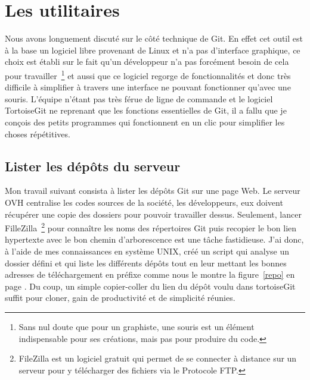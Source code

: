\section{Les utilitaires} %
\label{sec:Les utilitaires}

Nous avons longuement discuté sur le côté technique de Git. En effet cet
outil est à la base un logiciel libre provenant de Linux et n'a pas
d'interface graphique, ce choix est établi sur le fait qu'un développeur
n'a pas forcément besoin de cela pour travailler\, \footnote{Sans nul
doute que pour un graphiste, une souris est un élément indispensable
pour ses créations, mais pas pour produire du code.} et aussi que ce
logiciel regorge de fonctionnalités et donc très difficile à simplifier
à travers une interface ne pouvant fonctionner qu'avec une souris.
L'équipe n'étant pas très férue de ligne de commande et le logiciel
TortoiseGit ne reprenant que les fonctions essentielles de Git, il a
fallu que je conçois des petits programmes qui fonctionnent en un clic
pour simplifier les choses répétitives.

\subsection{Lister les dépôts du serveur} %
\label{sub:Lister les dépôts du serveur}

Mon travail suivant consista à lister les dépôts Git sur une page Web.
Le serveur OVH centralise les codes sources de la société, les
développeurs, eux doivent récupérer une copie des dossiers pour pouvoir
travailler dessus. Seulement, lancer FilleZilla\, \footnote{FileZilla
est un logiciel gratuit qui permet de se connecter à distance sur un
serveur pour y télécharger des fichiers via le Protocole FTP.} pour
connaître les noms des répertoires Git puis recopier le bon lien
hypertexte avec le bon chemin d'arborescence est une tâche fastidieuse.
J'ai donc, à l'aide de mes connaissances en système UNIX, créé un script
qui analyse un dossier défini et qui liste les différents dépôts tout en
leur mettant les bonnes adresses de téléchargement en préfixe comme nous
le montre la figure~\ref{repo} en page \pageref{repo}. Du coup, un
simple copier-coller du lien du dépôt voulu dans tortoiseGit suffit pour
cloner, gain de productivité et de simplicité réunies.

